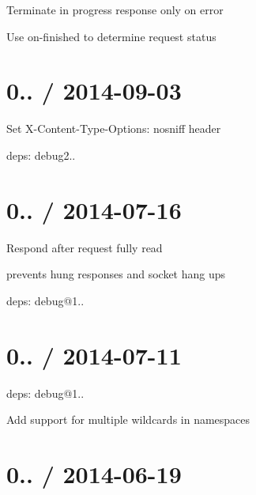 \begin{DoxyItemize}
\item Terminate in progress response only on error
\item Use {\ttfamily on-\/finished} to determine request status
\end{DoxyItemize}

\section*{0.. / 2014-\/09-\/03 }


\begin{DoxyItemize}
\item Set {\ttfamily X-\/\+Content-\/\+Type-\/\+Options\+: nosniff} header
\item deps\+: debug2..
\end{DoxyItemize}

\section*{0.. / 2014-\/07-\/16 }


\begin{DoxyItemize}
\item Respond after request fully read
\begin{DoxyItemize}
\item prevents hung responses and socket hang ups
\end{DoxyItemize}
\item deps\+: debug@1..
\end{DoxyItemize}

\section*{0.. / 2014-\/07-\/11 }


\begin{DoxyItemize}
\item deps\+: debug@1..
\begin{DoxyItemize}
\item Add support for multiple wildcards in namespaces
\end{DoxyItemize}
\end{DoxyItemize}

\section*{0.. / 2014-\/06-\/19 }


